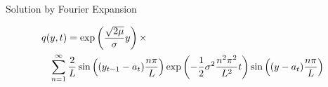 \documentclass{beamer}
\begin{document}
\begin{frame}{Solution by Fourier Expansion}
%
%

	\begin{eqnarray*}
		\lefteqn{ q(y,t) = \exp\left( \frac{\sqrt{2\mu}}{\sigma} y \right) \times} \\
		&&  \sum_{n=1}^\infty \frac{2}{L} \sin\left( (y_{t-1} - a_t) \frac{n \pi}{L} \right) \exp\left( -\frac{1}{2}\sigma^2 \frac{n^2 \pi^2}{L^2} t \right) \sin\left( (y-a_t) \frac{n\pi}{L} \right) \label{eq:q-final}
	\end{eqnarray*}	

\end{frame}
\end{document}

